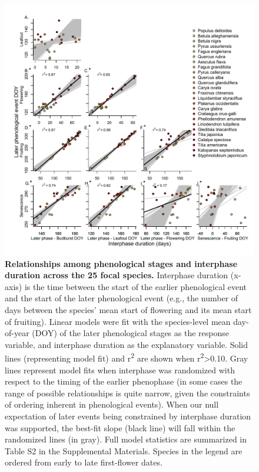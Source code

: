 \documentclass{article}
\begin{document}
\begin{figure}[h]
 \centering
 \includegraphics{../analyses/figures/Hyp2.pdf}
 \caption{\textbf{Relationships among phenological stages and interphase duration across the 25 focal species.} Interphase duration (x-axis) is the time between the start of the earlier phenological event and the start of the later phenological event (e.g., the number of days between the species' mean start of flowering and its mean start of fruiting). Linear models were fit with the species-level mean day-of-year (DOY) of the later phenological stages as the response variable, and interphase duration as the explanatory variable. Solid lines (representing model fit) and r\textsuperscript{2} are shown when r\textsuperscript{2}>0.10. Gray lines represent model fits when interphase was randomized with respect to the timing of the earlier phenophase (in some cases the range of possible relationships is quite narrow, given the constraints of ordering inherent in phenological events). When our null expectation of later events being constrained by interphase duration was supported, the best-fit slope (black line) will fall within the randomized lines (in gray). Full model statistics are summarized in Table S2 in the Supplemental Materials. Species in the legend are ordered from early to late first-flower dates.}
  \label{fig:inter}
  \end{figure}

\end{document}

